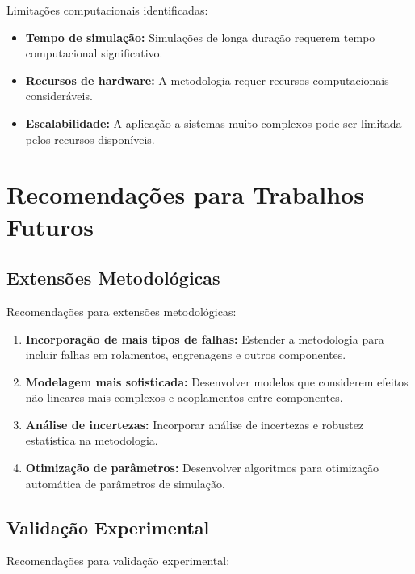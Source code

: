 Limitações computacionais identificadas:

\begin{itemize}
    \item \textbf{Tempo de simulação:} Simulações de longa duração requerem tempo computacional significativo.
    
    \item \textbf{Recursos de hardware:} A metodologia requer recursos computacionais consideráveis.
    
    \item \textbf{Escalabilidade:} A aplicação a sistemas muito complexos pode ser limitada pelos recursos disponíveis.
\end{itemize}

\section{Recomendações para Trabalhos Futuros}

\subsection{Extensões Metodológicas}

Recomendações para extensões metodológicas:

\begin{enumerate}
    \item \textbf{Incorporação de mais tipos de falhas:} Estender a metodologia para incluir falhas em rolamentos, engrenagens e outros componentes.
    
    \item \textbf{Modelagem mais sofisticada:} Desenvolver modelos que considerem efeitos não lineares mais complexos e acoplamentos entre componentes.
    
    \item \textbf{Análise de incertezas:} Incorporar análise de incertezas e robustez estatística na metodologia.
    
    \item \textbf{Otimização de parâmetros:} Desenvolver algoritmos para otimização automática de parâmetros de simulação.
\end{enumerate}

\subsection{Validação Experimental}

Recomendações para validação experimental:

